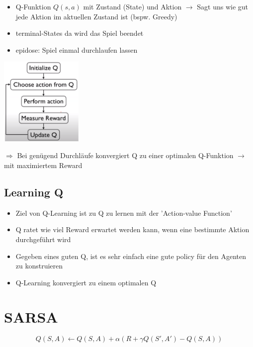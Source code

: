\documentclass{article}
\newenvironment{Figure}
	{\par\medskip\noindent\minipage{\linewidth}}
	{\endminipage\par\medskip}
\theoremstyle{merke}
\theoremstyle{definition}
\begin{document}
    \begin{itemize}
        \item Q-Funktion $Q(s,a)$ mit Zustand (State) und Aktion $\rightarrow$ Sagt uns wie gut jede Aktion im aktuellen Zustand ist (bspw. Greedy)
        \item terminal-States da wird das Spiel beendet
        \item epidose: Spiel einmal durchlaufen lassen
    \end{itemize}

    \begin{Figure}
    \centering
    \includegraphics[width=150px]{img/QFunktion.png}
        \label{fig:Ablauf zum Q-Learning}
    \end{Figure}
    
    $\Rightarrow$ Bei genügend Durchläufe konvergiert Q zu einer optimalen Q-Funktion $\rightarrow$ mit maximiertem Reward
    
        \subsection{Learning Q}
    \begin{itemize}
        \item Ziel von Q-Learning ist zu Q zu lernen mit der 'Action-value Function'
        \item Q ratet wie viel Reward erwartet werden kann, wenn eine bestimmte Aktion durchgeführt wird
        \item Gegeben eines guten Q, ist es sehr einfach eine gute policy für den Agenten zu konstruieren
        \item Q-Learning konvergiert zu einem optimalen Q
    \end{itemize}     

    \section{SARSA}

    \begin{equation}
        Q(S,A) \leftarrow Q(S,A) + \alpha (R+\gamma Q(S',A') - Q(S,A))
    \end{equation}
    
\end{document}
